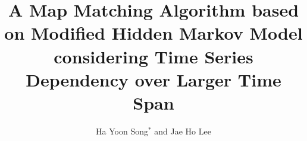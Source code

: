 \documentclass[preprint,12pt]{elsarticle}
\begin{document}
\begin{frontmatter}



\title{A Map Matching Algorithm based on Modified Hidden Markov Model considering Time Series Dependency over Larger Time Span}

\author{Ha Yoon Song$^{\ast}$ and Jae Ho Lee}
\address{Department of Computer Engineering, Hongik University, 94 Wausan-ro,\\ Mapo-gu, Seoul, South Korea}            


\end{frontmatter}
\end{document}
